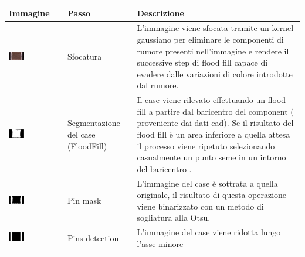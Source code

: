 \begin{tabularx}{\textwidth}{p{.3\linewidth} | p{.16\linewidth} |p{.45\linewidth}}
Immagine & Passo & Descrizione \\
\hline
\vspace{.5mm}
\includegraphics[width=0.3\textwidth]{img/smtcapacitor-sfocatura.png}& Sfocatura & L’immagine viene sfocata tramite un kernel gaussiano per eliminare le componenti di rumore presenti nell’immagine e rendere il successive step di flood fill capace di evadere dalle variazioni di colore introdotte dal rumore.\\
\hline
\vspace{.5mm}
\includegraphics[width=0.3\textwidth]{img/smtcapacitor-ff.png}& Segmentazione del case (FloodFill) & Il case viene rilevato effettuando un flood fill a partire dal baricentro del component ( proveniente dai dati cad). 
Se il risultato del flood fill è un area inferiore a quella attesa
il processo viene ripetuto selezionando casualmente un
punto seme in un intorno del baricentro .\\
\hline
\vspace{.5mm}
\includegraphics[width=0.3\textwidth]{img/smtcapacitor-pinmask.png}& Pin mask & L’immagine del case è sottrata a quella originale, il risultato di questa operazione viene binarizzato con un metodo di sogliatura alla Otsu.\\
\hline
\vspace{.5mm}
\includegraphics[width=0.3\textwidth]{img/smtcapacitor-pd.png}& Pins detection & L’immagine del case viene ridotta lungo l’asse minore

\end{tabularx}
